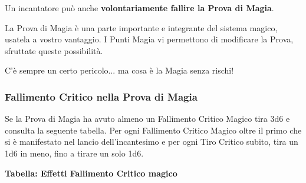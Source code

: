 \begin{multicols}{2}
Un incantatore può anche \textbf{volontariamente fallire la Prova di Magia}.

\begin{changemargin}{0.3cm}{0.3cm}\begin{tcolorbox}[title = Osare la Prova di Magia]
La Prova di Magia è una parte importante e integrante del sistema magico, usatela a vostro vantaggio. I Punti Magia vi permettono di modificare la Prova, sfruttate queste possibilità.

C'è sempre un certo pericolo... ma cosa è la Magia senza rischi!
\end{tcolorbox}\end{changemargin}




\subsubsection{Fallimento Critico nella Prova di Magia}\label{magiefallimentocriticonellaprovadimagia}\hypertarget{magiefallimentocriticonellaprovadimagia}{}

Se la Prova di Magia ha avuto almeno un Fallimento Critico Magico tira 3d6 e consulta la seguente tabella. Per ogni Fallimento Critico Magico oltre il primo che si è manifestato nel lancio dell'incantesimo e per ogni Tiro Critico subito, tira un 1d6 in meno, fino a tirare un solo 1d6.

\textbf{Tabella: Effetti Fallimento Critico magico}

\medskip


\end{multicols}
